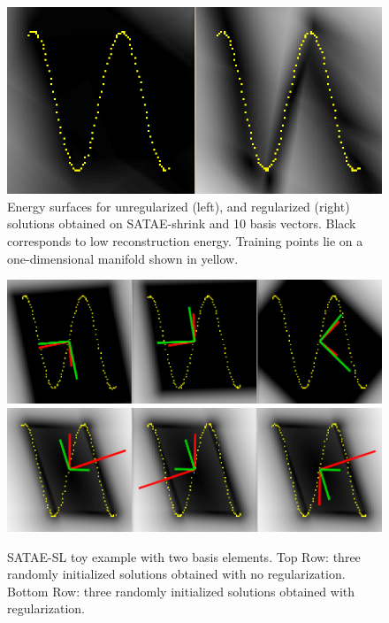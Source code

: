 \documentclass{article} %
\begin{document}
\begin{figure}
\centering 
\includegraphics[scale=0.25]{.//toy_shrink.png}
\caption{Energy surfaces for unregularized (left), and regularized (right) solutions obtained on SATAE-shrink and 10 basis vectors. Black corresponds to low reconstruction energy. Training points lie on a one-dimensional manifold shown in yellow.}  
\label{fig:toyshrink}
\end{figure} 

\begin{figure}
\centering 
\includegraphics[scale=0.25]{.//toy_sat_linear_noreg.png}
\includegraphics[scale=0.25]{.//toy_sat_linear_reg.png}
\caption{SATAE-SL toy example with two basis elements. Top Row: three randomly initialized solutions obtained with no regularization. Bottom Row: three randomly initialized solutions obtained with regularization.}  
\label{fig:toysatlinear} 
\end{figure} 
\end{document}
